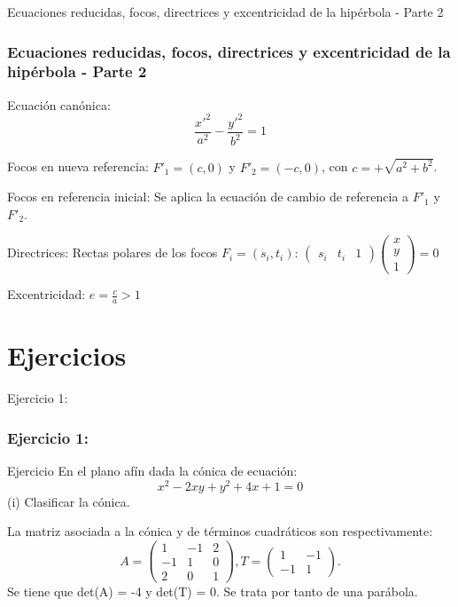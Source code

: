 \documentclass[xcolor={dvipsnames},aspectratio=169,10pt]{beamer}
\begin{document}
\begin{frame}{Ecuaciones reducidas, focos, directrices y excentricidad de la hipérbola - Parte 2}
  \frametitle{Ecuaciones reducidas, focos, directrices y excentricidad de la hipérbola - Parte 2}
    Ecuación canónica:
    \[\frac{x'^2}{a^2} - \frac{y'^2}{b^2} = 1\]
    
    Focos en nueva referencia: $F'_1 = (c, 0)$ y $F'_2 = (-c, 0)$, con $c = +\sqrt{a^2 + b^2}$.
    
    Focos en referencia inicial: Se aplica la ecuación de cambio de referencia a $F'_1$ y $F'_2$.
    
    Directrices: Rectas polares de los focos $F_i = (s_i, t_i)$: $\begin{pmatrix} s_i & t_i & 1 \end{pmatrix} \begin{pmatrix} x \\ y \\ 1 \end{pmatrix} = 0$
    
    Excentricidad: $e = \frac{c}{a} > 1$
\end{frame}

\section{Ejercicios}
\begin{frame}{Ejercicio 1:}
  \frametitle{Ejercicio 1:}
  \begin{block}{Ejercicio}
    En el plano afín dada la cónica de ecuación:
    \[x^2 - 2xy + y^2 + 4x + 1 = 0\]
    (i) Clasificar la cónica.
  \end{block}
    La matriz asociada a la cónica y de términos cuadráticos son respectivamente:
    \[A = \begin{pmatrix} 1 & -1 & 2 \\ -1 & 1 & 0 \\ 2 & 0 & 1 \end{pmatrix}, T = \begin{pmatrix} 1 & -1 \\ -1 & 1 \end{pmatrix}.\]
    Se tiene que det(A) = -4 y det(T) = 0. Se trata por tanto de una parábola.
\end{frame}
\end{document}
